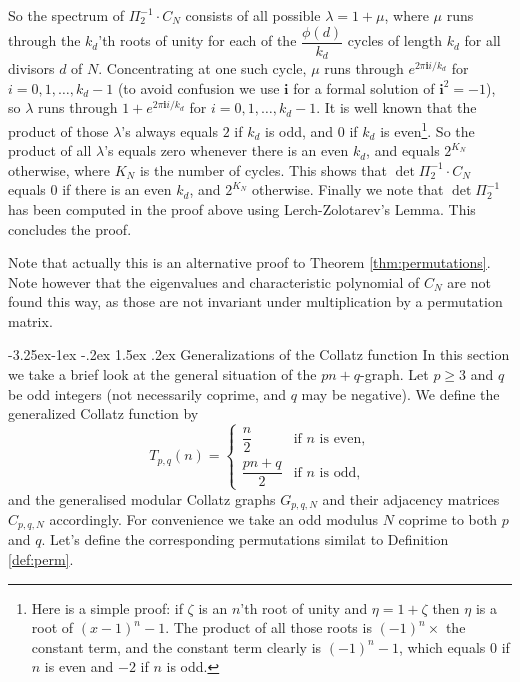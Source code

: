 \documentclass[10pt]{article}
\makeatletter
\renewcommand\subsection{\@startsection{subsection}{2}{\z@}
{-3.25ex\@plus -1ex \@minus -.2ex}
{1.5ex \@plus .2ex}
{\normalfont\normalsize\bfseries\boldmath}}
\theoremstyle{definition}
\newcommand{\ii}{\mathbf{i}}
\makeatother
\begin{document}
So the spectrum of $ \Pi_2^{-1} \cdot C_N $ consists of all possible $ \lambda = 1 + \mu $, where $ \mu $
runs through the $ k_d $'th roots of unity for each of the $ \dfrac{\phi(d)}{k_d} $ cycles of length
$ k_d $ for all divisors $ d $ of $ N $. Concentrating at one such cycle, $ \mu $ runs through
$ e^{2\pi \ii i/k_d} $ for $ i = 0, 1, \ldots, k_d-1 $ (to avoid confusion we use $ \ii $ for a formal
solution of $ \ii^2 = -1 $), so $ \lambda $ runs through
$ 1 + e^{2\pi \ii i/k_d} $ for $ i = 0, 1, \ldots, k_d-1 $. It is well known that the product of those
$ \lambda $'s always equals $ 2 $ if $ k_d $ is odd, and $ 0 $ if $ k_d $ is even\footnote{Here is a
    simple proof: if $ \zeta $ is an $ n $'th root of unity and $ \eta = 1 + \zeta $ then $ \eta $ is a root
    of $ (x-1)^n - 1 $. The product of all those roots is $ (-1)^n \times $ the constant term, and the
    constant term clearly is $ (-1)^n - 1 $, which equals $ 0 $ if $ n $ is even and $ -2 $ if $ n $ is
    odd.}. So the product of all $ \lambda $'s equals zero whenever there is an even $ k_d $, and equals
$ 2^{K_N} $ otherwise, where $ K_N $ is the number of cycles. This shows that
$ \det \Pi_2^{-1} \cdot C_N $ equals $ 0 $ if there is an even $ k_d $, and $ 2^{K_N} $ otherwise.
Finally we note that $ \det \Pi_2^{-1} $ has been computed in the proof above using Lerch-Zolotarev's
Lemma. This concludes the proof.

Note that actually this is an alternative proof to Theorem \ref{thm:permutations}. Note however that the
eigenvalues and characteristic polynomial of $ C_N $ are not found this way, as those are not invariant
under multiplication by a permutation matrix.

\subsection{Generalizations of the Collatz function}
In this section we take a brief look at the general situation of the $ p n + q $-graph. Let $ p \geq 3 $
and $ q $ be odd integers (not necessarily coprime, and $ q $ may be negative). We define the generalized
Collatz function by
\begin{equation}
    T_{p,q}(n) = \begin{cases}
        \dfrac{n}{2} & \text{if } n \text{ is even,} \\[3mm]
        \dfrac{pn+q}{2} & \text{if } n \text{ is odd,}
    \end{cases}
\end{equation}
and the generalised modular Collatz graphs $ G_{p,q,N} $ and their adjacency matrices $ C_{p,q,N} $
accordingly. For convenience we take an odd modulus $ N $ coprime to both $ p $ and $ q $. Let's define
the corresponding permutations similat to Definition \ref{def:perm}.
\end{document}
